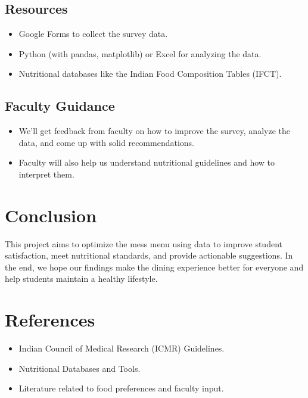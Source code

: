 \documentclass[12pt,a4paper]{article}
\begin{document}
\subsection{Resources}
\begin{itemize}
    \item Google Forms to collect the survey data.
    \item Python (with pandas, matplotlib) or Excel for analyzing the data.
    \item Nutritional databases like the Indian Food Composition Tables (IFCT).
\end{itemize}

\subsection{Faculty Guidance}
\begin{itemize}
    \item We’ll get feedback from faculty on how to improve the survey, analyze the data, and come up with solid recommendations.
    \item Faculty will also help us understand nutritional guidelines and how to interpret them.
\end{itemize}

\section{Conclusion}
This project aims to optimize the mess menu using data to improve student satisfaction, meet nutritional standards, and provide actionable suggestions. In the end, we hope our findings make the dining experience better for everyone and help students maintain a healthy lifestyle.

\section{References}
\begin{itemize}
    \item Indian Council of Medical Research (ICMR) Guidelines.
    \item Nutritional Databases and Tools.
    \item Literature related to food preferences and faculty input.
\end{itemize}
\end{document}
